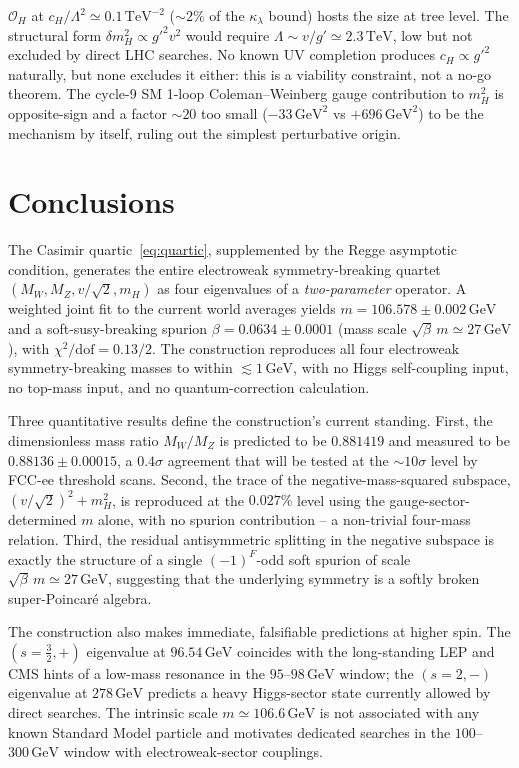 \documentclass[twocolumn,aps,prd,floatfix,nofootinbib,superscriptaddress,10pt]{article}
\newcommand{\MW}{M_W}
\newcommand{\MZ}{M_Z}
\newcommand{\mH}{m_H}
\newcommand{\GeV}{\,\mathrm{GeV}}
\begin{document}
$\mathcal O_H$ at $c_H/\Lambda^2 \simeq 0.1\,\mathrm{TeV}^{-2}$ ($\sim 2\%$ of the $\kappa_\lambda$ bound) hosts the size at tree level.  The structural form $\delta\mH^2 \propto g'^2 v^2$ would require $\Lambda \sim v/g' \simeq 2.3\,\mathrm{TeV}$, low but not excluded by direct LHC searches.  No known UV completion produces $c_H \propto g'^2$ naturally, but none excludes it either: this is a viability constraint, not a no-go theorem.  The cycle-9 SM 1-loop Coleman--Weinberg gauge contribution to $\mH^2$ is opposite-sign and a factor $\sim 20$ too small ($-33\GeV^2$ vs $+696\GeV^2$) to be the mechanism by itself, ruling out the simplest perturbative origin.

\section{Conclusions}

The Casimir quartic~\eqref{eq:quartic}, supplemented by the Regge asymptotic condition, generates the entire electroweak symmetry-breaking quartet $(\MW,\MZ,v/\sqrt{2},\mH)$ as four eigenvalues of a {\em two-parameter} operator. A weighted joint fit to the current world averages yields $m=106.578\pm 0.002\GeV$ and a soft-susy-breaking spurion $\beta=0.0634\pm 0.0001$ (mass scale $\sqrt{\beta}\,m\simeq 27\GeV$), with $\chi^2/\mathrm{dof}=0.13/2$. The construction reproduces all four electroweak symmetry-breaking masses to within $\lesssim 1\GeV$, with no Higgs self-coupling input, no top-mass input, and no quantum-correction calculation.

Three quantitative results define the construction's current standing. First, the dimensionless mass ratio $\MW/\MZ$ is predicted to be $0.881419$ and measured to be $0.88136\pm 0.00015$, a $0.4\sigma$ agreement that will be tested at the $\sim 10\sigma$ level by FCC-ee threshold scans. Second, the trace of the negative-mass-squared subspace, $(v/\sqrt{2})^2+\mH^2$, is reproduced at the $0.027\%$ level using the gauge-sector-determined $m$ alone, with no spurion contribution -- a non-trivial four-mass relation. Third, the residual antisymmetric splitting in the negative subspace is exactly the structure of a single $(-1)^F$-odd soft spurion of scale $\sqrt{\beta}\,m\simeq 27\GeV$, suggesting that the underlying symmetry is a softly broken super-Poincar\'e algebra.

The construction also makes immediate, falsifiable predictions at higher spin. The $(s=\tfrac32,+)$ eigenvalue at $96.54\GeV$ coincides with the long-standing LEP and CMS hints of a low-mass resonance in the $95$--$98\GeV$ window; the $(s=2,-)$ eigenvalue at $278\GeV$ predicts a heavy Higgs-sector state currently allowed by direct searches. The intrinsic scale $m\simeq 106.6\GeV$ is not associated with any known Standard Model particle and motivates dedicated searches in the $100$--$300\GeV$ window with electroweak-sector couplings.
\end{document}

